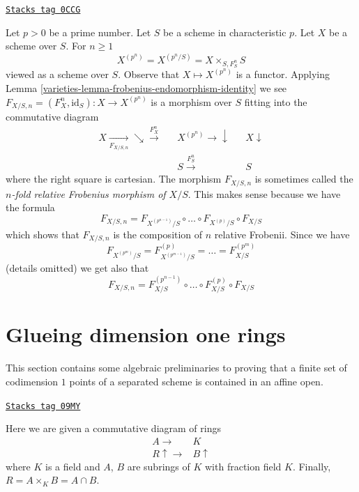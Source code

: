 \begin{remark}
\label{varieties-remark-n-fold-relative-frobenius}
\href{https://stacks.math.columbia.edu/tag/0CCG}{\texttt{Stacks tag 0CCG}}

Let $p > 0$ be a prime number. Let $S$ be a scheme in characteristic $p$.
Let $X$ be a scheme over $S$. For $n \geq 1$
$$
X^{(p^n)} = X^{(p^n/S)} = X \times_{S, F_S^n} S
$$
viewed as a scheme over $S$. Observe that $X \mapsto X^{(p^n)}$
is a functor. Applying
Lemma \ref{varieties-lemma-frobenius-endomorphism-identity}
we see $F_{X/S, n} = (F_X^n, \text{id}_S) : X \longrightarrow X^{(p^n)}$
is a morphism over $S$ fitting into the commutative diagram
$$
\begin{array}{ccccc}X \underset{F_{X/S, n}}{\longrightarrow}\searrow\overset{F_X^n}{\longrightarrow} &  & X^{(p^n)} \longrightarrow\downarrow &  & X \downarrow \\  &  & S \overset{F_S^n}{\longrightarrow} &  & S\end{array}
$$
where the right square is cartesian. The morphism $F_{X/S, n}$
is sometimes called the
{\it $n$-fold relative Frobenius morphism of $X/S$}.
This makes sense because we have the formula
$$
F_{X/S, n} =
F_{X^{(p^{n - 1})}/S} \circ \ldots \circ F_{X^{(p)}/S} \circ F_{X/S}
$$
which shows that $F_{X/S, n}$ is the composition of $n$ relative
Frobenii. Since we have
$$
F_{X^{(p^m)}/S} = F_{X^{(p^{m - 1})}/S}^{(p)} = \ldots = F_{X/S}^{(p^m)}
$$
(details omitted) we get also that
$$
F_{X/S, n} =
F_{X/S}^{(p^{n - 1})} \circ \ldots \circ F_{X/S}^{(p)} \circ F_{X/S}
$$
\end{remark}

\section{Glueing dimension one rings}
\label{varieties-section-glueing-dim-1}
This section contains some algebraic preliminaries to proving that
a finite set of codimension $1$ points of a separated scheme is
contained in an affine open.

\begin{definition}
\label{varieties-situation-glue}
\href{https://stacks.math.columbia.edu/tag/09MY}{\texttt{Stacks tag 09MY}}

Here we are given a commutative diagram of rings
$$
\begin{array}{cc}A \longrightarrow & K \\ R \uparrow\longrightarrow & B \uparrow\end{array}
$$
where $K$ is a field and $A$, $B$ are subrings of $K$ with fraction
field $K$. Finally, $R = A \times_K B = A \cap B$.
\end{definition}

